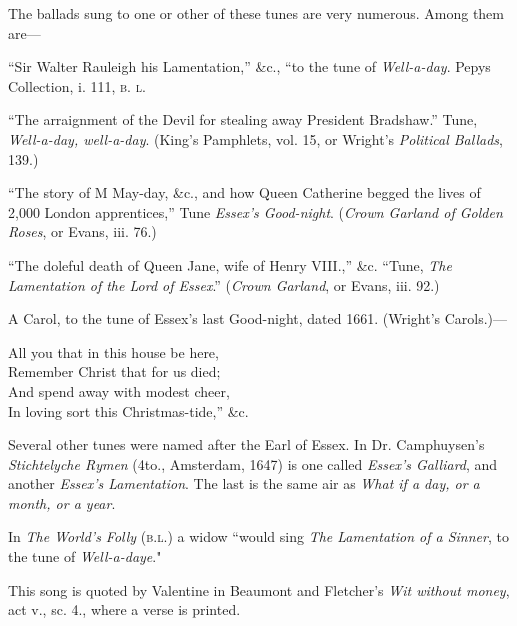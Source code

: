 The ballads sung to one or other of these tunes are very numerous. Among
them are—

“Sir Walter Rauleigh his Lamentation,” \&c., “to the tune of \textit{Well-a-day}.
Pepys Collection, i. 111, \textsc{b. l.}

“The arraignment of the Devil for stealing away President Bradshaw.” Tune,
\textit{Well-a-day, well-a-day}. (King’s Pamphlets, vol. 15, or Wright’s \textit{Political
Ballads}, 139.)
\pagebreak

“The story of {\blackletter M} May-day, \&c., and how Queen Catherine begged the lives of
2,000 London apprentices,” Tune \textit{Essex's Good-night}. (\textit{Crown Garland of
Golden Roses}, or Evans, iii. 76.)

“The doleful death of Queen Jane, wife of Henry VIII.,” \&c. “Tune,
\textit{The Lamentation of the Lord of Essex}.” (\textit{Crown Garland}, or Evans, iii. 92.)

A Carol, to the tune of Essex’s last Good-night, dated 1661. (Wright’s
Carols.)—
\settowidth{\versewidth}{All you that in this house be here,}
\begin{scverse}\begin{altverse}
All you that in this house be here,\\
Remember Christ that for us died;\\
And spend away with modest cheer,\\
In loving sort this Christmas-tide,” \&c.
\end{altverse}
\end{scverse}

Several other tunes were named after the Earl of Essex. In Dr. Camphuysen’s
\textit{Stichtelyche Rymen} (4to., Amsterdam, 1647) is one called \textit{Essex's Galliard}, and
another \textit{Essex's Lamentation}. The last is the same air as \textit{What if a day, or a
month, or a year}.

In \textit{The World's Folly} (\textsc{b.l.}) a widow “would sing \textit{The Lamentation of a Sinner},
to the tune of \textit{Well-a-daye}."
\normalsize %




This song is quoted by Valentine in Beaumont and Fletcher’s \textit{Wit without
money}, act v., sc. 4., where a verse is printed.

